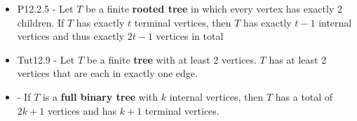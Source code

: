 \documentclass[10pt, landscape]{article}
\renewcommand{\bf}[1]{\textbf{#1}}
\begin{document}
\begin{multicols}{3}
\begin{itemize}
        \item P12.2.5 - Let $T$ be a finite \bf{rooted tree} in which every vertex has exactly 2 children. If $T$ has exactly $t$ terminal vertices, then $T$ has exactly $t-1$ internal vertices and thus exactly $2t-1$ vertices in total
        \item Tut12.9 - Let $T$ be a finite \bf{tree} with at least 2 vertices. $T$ has at least 2 vertices that are each in exactly one edge.
        \item - If $T$ is a \bf{full binary tree} with $k$ internal vertices, then $T$ has a total of $2k + 1$ vertices and has $k+1$ terminal vertices.
    \end{itemize}

\begin{center}
\end{center}
\end{multicols}
\end{document}
